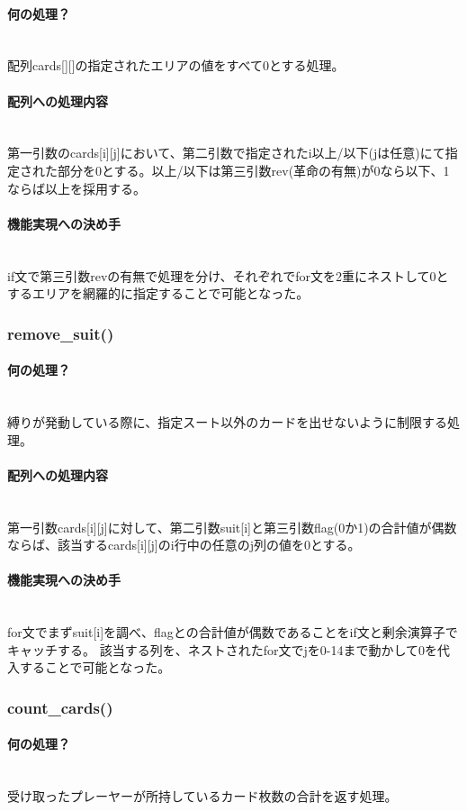 \documentclass[11pt,a4paper, uplatex]{jsarticle}
\begin{document}
\paragraph{何の処理？}\mbox{}\\
配列cards[][]の指定されたエリアの値をすべて0とする処理。
\paragraph{配列への処理内容}\mbox{}\\
第一引数のcards[i][j]において、第二引数で指定されたi以上/以下(jは任意)にて指定された部分を0とする。以上/以下は第三引数rev(革命の有無)が0なら以下、1ならば以上を採用する。
\paragraph{機能実現への決め手}\mbox{}\\
if文で第三引数revの有無で処理を分け、それぞれでfor文を2重にネストして0とするエリアを網羅的に指定することで可能となった。
%
\subsubsection{remove\_suit()}
\paragraph{何の処理？}\mbox{}\\
縛りが発動している際に、指定スート以外のカードを出せないように制限する処理。
\paragraph{配列への処理内容}\mbox{}\\
第一引数cards[i][j]に対して、第二引数suit[i]と第三引数flag(0か1)の合計値が偶数ならば、該当するcards[i][j]のi行中の任意のj列の値を0とする。
\paragraph{機能実現への決め手}\mbox{}\\
for文でまずsuit[i]を調べ、flagとの合計値が偶数であることをif文と剰余演算子でキャッチする。
該当する列を、ネストされたfor文でjを0-14まで動かして0を代入することで可能となった。
%
\subsubsection{count\_cards()}
\paragraph{何の処理？}\mbox{}\\
受け取ったプレーヤーが所持しているカード枚数の合計を返す処理。
\end{document}
